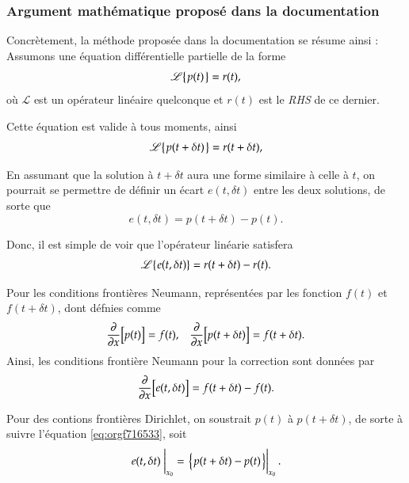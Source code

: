 \documentclass[10pt]{article}
\numberwithin{equation}{section}
\newcommand{\pt}{\hspace{1pt}}
\newcommand{\tall}{\vphantom{A^{x^x}_p}}
\begin{document}
\subsubsection{Argument mathématique proposé dans la documentation}
\label{sec:org3c9f317}
Concrètement, la méthode proposée dans la documentation se résume ainsi :
Assumons une équation différentielle partielle de la forme
\begin{equation}
   \mathscr{L}\qty{\pt p(t)\pt} = r(t),
\end{equation}
où \(\mathscr{L}\) est un opérateur linéaire quelconque et \(r(t)\) est le \emph{RHS} de ce dernier.\bigskip

Cette équation est valide à tous moments, ainsi
\begin{equation}
   \mathscr{L}\qty{\pt p(t+\delta t)\pt} = r(t+\delta t),
\end{equation}

En assumant que la solution à \(t+\delta t\) aura une forme similaire à celle à \(t\), on pourrait se permettre de définir un écart \(e(t,\delta t)\) entre les deux solutions, de sorte que
\begin{equation}
\label{eq:orgf716533}
   e(t,\delta t) = p(t+\delta t) - p(t).
\end{equation}

Donc, il est simple de voir que l'opérateur linéarie satisfera
\begin{equation}
   \mathscr{L}\qty{\pt e(t,\delta t)} = r(t+\delta t) - r(t).
\end{equation}

Pour les conditions frontières Neumann, représentées par les fonction \(f(t)\) et \(f(t+\delta t)\), dont défnies comme
\begin{align}
   && \pdv{}{x} \qty[ \tall p(t) ] = f(t), && \pdv{}{x} \qty[\tall p(t+\delta t)] = f(t+\delta t). &&
\end{align}
Ainsi, les conditions frontière Neumann pour la correction sont données par
\begin{equation}
   \pdv{}{x} \qty[ \tall e(t,\delta t) ]  = f(t+\delta t) - f(t).
\end{equation}

Pour des contions frontières Dirichlet, on soustrait \(p(t)\) à \(p(t+\delta t)\), de sorte à suivre l'équation \ref{eq:orgf716533}, soit
\begin{equation}
   \eval{e(t,\delta t)\ }_{x_0} = \eval{ \qty{ \pt p(t+\delta t) - p(t)\pt \tall } }_{x_0}.
\end{equation}
\end{document}
